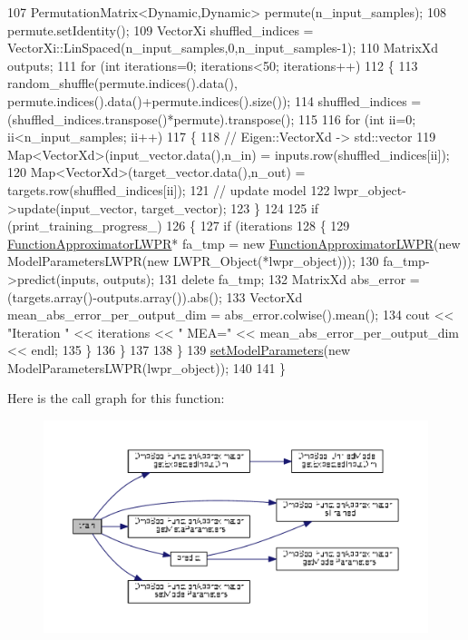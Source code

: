 \begin{DoxyCode}
107   PermutationMatrix<Dynamic,Dynamic> permute(n\_input\_samples);  
108   permute.setIdentity();
109   VectorXi shuffled\_indices = VectorXi::LinSpaced(n\_input\_samples,0,n\_input\_samples-1);
110   MatrixXd outputs;
111   \textcolor{keywordflow}{for} (\textcolor{keywordtype}{int} iterations=0; iterations<50; iterations++)
112   \{
113     random\_shuffle(permute.indices().data(), permute.indices().data()+permute.indices().size());
114     shuffled\_indices = (shuffled\_indices.transpose()*permute).transpose();
115 
116     \textcolor{keywordflow}{for} (\textcolor{keywordtype}{int} ii=0; ii<n\_input\_samples; ii++)
117     \{
118       \textcolor{comment}{// Eigen::VectorXd -> std::vector}
119       Map<VectorXd>(input\_vector.data(),n\_in) = inputs.row(shuffled\_indices[ii]);  
120       Map<VectorXd>(target\_vector.data(),n\_out) = targets.row(shuffled\_indices[ii]);
121       \textcolor{comment}{// update model}
122       lwpr\_object->update(input\_vector, target\_vector);
123     \}
124 
125     \textcolor{keywordflow}{if} (print\_training\_progress\_)
126     \{
127       \textcolor{keywordflow}{if} (iterations%
128       \{
129         \hyperlink{classDmpBbo_1_1FunctionApproximatorLWPR_ae20c704e818a6af0beb9189a4c37927b}{FunctionApproximatorLWPR}* fa\_tmp = \textcolor{keyword}{new} 
      \hyperlink{classDmpBbo_1_1FunctionApproximatorLWPR_ae20c704e818a6af0beb9189a4c37927b}{FunctionApproximatorLWPR}(\textcolor{keyword}{new} ModelParametersLWPR(\textcolor{keyword}{new} LWPR\_Object(*lwpr\_object)));
130         fa\_tmp->predict(inputs, outputs);
131         \textcolor{keyword}{delete} fa\_tmp;
132         MatrixXd abs\_error = (targets.array()-outputs.array()).abs();
133         VectorXd mean\_abs\_error\_per\_output\_dim = abs\_error.colwise().mean();
134         cout << \textcolor{stringliteral}{"Iteration "} << iterations << \textcolor{stringliteral}{" MEA="} << mean\_abs\_error\_per\_output\_dim << endl;
135       \}
136     \}
137     
138   \}
139   \hyperlink{classDmpBbo_1_1FunctionApproximator_afd6f9d480456b90c4740c7aaca084ba4}{setModelParameters}(\textcolor{keyword}{new} ModelParametersLWPR(lwpr\_object));
140   
141 \}
\end{DoxyCode}


Here is the call graph for this function\+:
\nopagebreak
\begin{figure}[H]
\begin{center}
\leavevmode
\includegraphics[width=350pt]{classDmpBbo_1_1FunctionApproximatorLWPR_ac453415cf4894aba45e8db6ebc4cd4dc_cgraph}
\end{center}
\end{figure}


